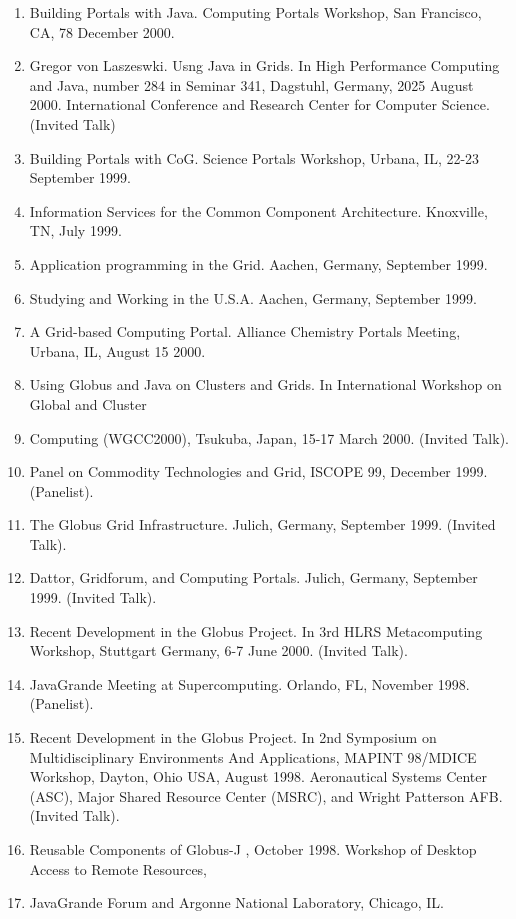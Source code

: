 \documentclass{article}
\begin{document}
\begin{enumerate}
\item  Building Portals with Java. Computing Portals Workshop, San Francisco, CA, 78 December 2000. 
\item  Gregor von Laszeswki. Usng Java in Grids. In High Performance Computing and Java, number 284 in Seminar 341, Dagstuhl, Germany, 2025 August 2000. International Conference and Research Center for Computer Science. (Invited Talk) 
\item  Building Portals with CoG. Science Portals Workshop, Urbana, IL, 22-23 September 1999. 
\item  Information Services for the Common Component Architecture. Knoxville, TN, July 1999. 
\item  Application programming in the Grid. Aachen, Germany, September 1999. 
\item  Studying and Working in the U.S.A. Aachen, Germany, September 1999. 
\item  A Grid-based Computing Portal. Alliance Chemistry Portals Meeting, Urbana, IL, August 15 2000. 
\item  Using Globus and Java on Clusters and Grids. In International Workshop on Global and Cluster 
\item  Computing (WGCC2000), Tsukuba, Japan, 15-17 March 2000. (Invited Talk). 
\item  Panel on Commodity Technologies and Grid, ISCOPE 99, December 1999. (Panelist). 
\item  The Globus Grid Infrastructure. Julich, Germany, September 1999. (Invited Talk). 
\item  Dattor, Gridforum, and Computing Portals. Julich, Germany, September 1999. (Invited Talk). 
\item  Recent Development in the Globus Project. In 3rd HLRS Metacomputing Workshop, Stuttgart Germany, 6-7 June 2000. (Invited Talk). 
\item  JavaGrande Meeting at Supercomputing. Orlando, FL, November 1998. (Panelist). 
\item  Recent Development in the Globus Project. In 2nd Symposium on Multidisciplinary Environments And Applications, MAPINT 98/MDICE Workshop, Dayton, Ohio USA, August 1998. Aeronautical Systems Center (ASC), Major Shared Resource Center (MSRC), and Wright Patterson AFB. (Invited Talk). 
\item  Reusable Components of Globus-J , October 1998. Workshop of Desktop Access to Remote Resources,  
\item  JavaGrande Forum and Argonne National Laboratory, Chicago, IL.  

\end{enumerate}
\end{document}
